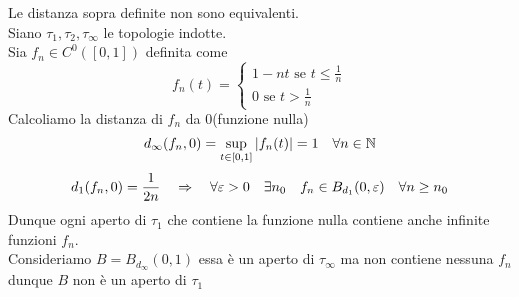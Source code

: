 \begin{oss}Le distanza sopra definite non sono equivalenti.\\
Siano $\tau_1, \tau_2, \tau_\infty$ le topologie indotte.\\
Sia $f_n \in C^{0}([0,1])$ definita come 
$$ f_n(t) = \begin{cases} 1-nt \text{ se } t \leq \frac{1}{n}\\ 0 \text{ se } t > \frac{1}{n}
\end{cases}$$
Calcoliamo la distanza di $f_n$ da $0$(funzione nulla)
$$ d_\infty(f_n, 0)= \sup_{t\in [0,1]} \vert f_n(t)\vert = 1\quad \forall n \in \mathbb{N}$$
$$d_1(f_n,0) =\frac{1}{2n} \quad \Rightarrow \quad \forall	 \varepsilon >0 \quad \exists n_0 \quad f_n \in B_{d_1}(0, \varepsilon) \quad \forall n \geq n_0$$
Dunque ogni aperto di $\tau_1$ che contiene la funzione nulla contiene anche infinite funzioni $f_n$.\\
Consideriamo $B=B_{d_\infty}(0,1) $ essa \`e un aperto di $\tau_\infty$ ma non contiene nessuna $f_n$ dunque $B$ non \`e un aperto di $\tau_1$
\end{oss}
\newpage

